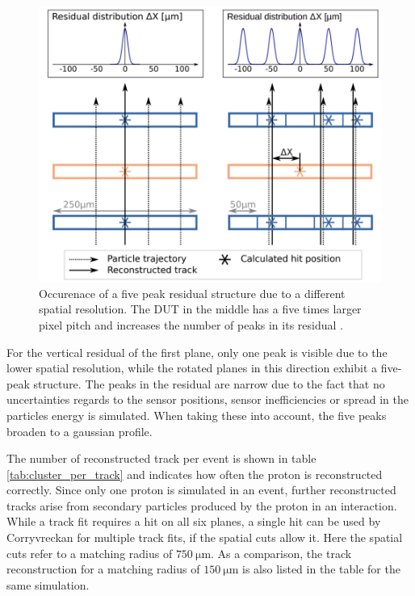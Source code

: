 \begin{figure}
  \centering
  \includegraphics[height=0.6\textwidth]{images/peaks.png}
  \caption{Occurenace of a five peak residual structure due to a different spatial resolution. The DUT in the middle
  has a five times larger pixel pitch and increases the number of peaks in its residual \cite{peaks}.}
  \label{fig:peaks}
\end{figure}

For the vertical residual of the first plane, only one peak is visible due to the lower spatial resolution, while the rotated planes
in this direction exhibit a five-peak structure. The peaks in the residual are narrow due to the fact that no uncertainties regards
to the sensor positions, sensor inefficiencies or spread in the particles energy is simulated. When taking these into account, the
five peaks broaden to a gaussian profile.

The number of reconstructed track per event is shown in table \ref{tab:cluster_per_track} and indicates how often the proton is
reconstructed correctly. Since only one proton is simulated in an event, further reconstructed tracks arise from secondary
particles produced by the proton in an interaction. While a track fit requires a hit on all six planes, a single hit can be used by
Corryvreckan for multiple track fits, if the spatial cuts allow it. Here the spatial cuts refer to a matching radius of $\SI{750}{\micro\meter}$.
As a comparison, the track reconstruction for a matching radius of $\SI{150}{\micro\meter}$ is also listed in the table for the same
simulation.

